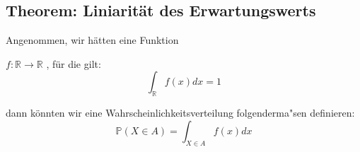 \vspace{10pt}

\subsection *{Theorem: Liniarit\"at des Erwartungswerts}

\vspace{5pt}

Angenommen, wir h\"atten eine Funktion
\vspace{3pt}

$f: \mathds{R} \longrightarrow \mathds{R}$ , f\"ur die gilt: 
\begin{equation*}
\int_{\mathds{R}} f(x) dx = 1
\end{equation*}

\vspace{3pt}

dann k\"onnten wir eine Wahrscheinlichkeitsverteilung folgenderma"sen definieren:
\begin{equation*}
\mathds{P} ({X\in A}) = \int_{X \in A} f(x) dx
\end{equation*}



